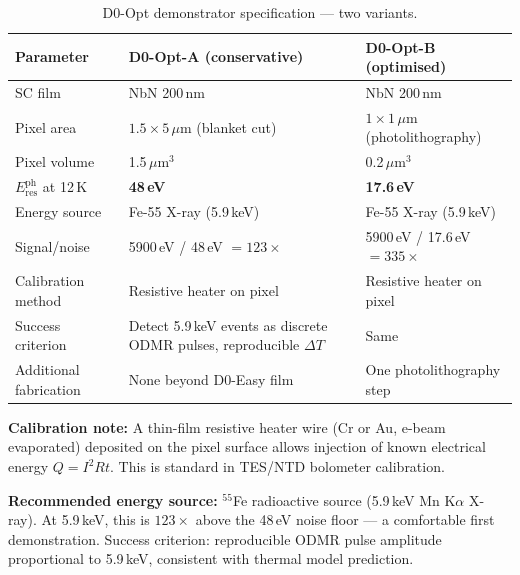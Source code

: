 \begin{table}[ht]
\centering
\caption{D0-Opt demonstrator specification --- two variants.}
\label{tab:q6_d0opt}
\small
\begin{tabular}{@{}p{4.5cm}p{3.5cm}p{4cm}@{}}
\toprule
Parameter & D0-Opt-A (conservative) & D0-Opt-B (optimised) \\
\midrule
SC film & NbN 200\,nm & NbN 200\,nm \\
Pixel area & $1.5 \times 5\,\mu$m (blanket cut) & $1 \times 1\,\mu$m (photolithography) \\
Pixel volume & 1.5\,$\mu$m$^3$ & 0.2\,$\mu$m$^3$ \\
$E_\mathrm{res}^\mathrm{ph}$ at 12\,K & \textbf{48\,eV} & \textbf{17.6\,eV} \\
Energy source & Fe-55 X-ray (5.9\,keV) & Fe-55 X-ray (5.9\,keV) \\
Signal/noise & 5900\,eV / 48\,eV $= 123\times$ & 5900\,eV / 17.6\,eV $= 335\times$ \\
Calibration method & Resistive heater on pixel & Resistive heater on pixel \\
Success criterion & Detect 5.9\,keV events as discrete ODMR pulses, reproducible $\Delta T$
  & Same \\
Additional fabrication & None beyond D0-Easy film & One photolithography step \\
\bottomrule
\end{tabular}
\end{table}

\textbf{Calibration note:} A thin-film resistive heater wire (Cr or Au, e-beam
evaporated) deposited on the pixel surface allows injection of known electrical
energy $Q = I^2 R t$. This is standard in TES/NTD bolometer calibration.~\cite{Richards1994}

\textbf{Recommended energy source:} $^{55}$Fe radioactive source (5.9\,keV Mn
K$\alpha$ X-ray). At 5.9\,keV, this is $123\times$ above the 48\,eV noise floor ---
a comfortable first demonstration. Success criterion: reproducible ODMR pulse
amplitude proportional to 5.9\,keV, consistent with thermal model prediction.


